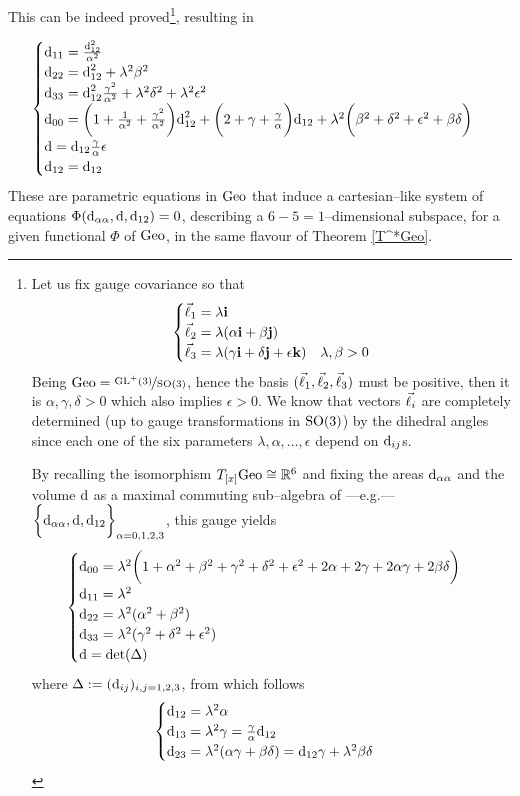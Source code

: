 This can be indeed proved\footnote{Let us fix gauge covariance so that
$$\begin{cases}
    \vec{\ell}_1=\lambda\mathbf{i}\\
    \vec{\ell}_2=\lambda(\alpha\mathbf{i}+\beta\mathbf{j})\\
    \vec{\ell}_3=\lambda(\gamma\mathbf{i}+\delta\mathbf{j}+\epsilon\mathbf{k})&\lambda,\beta>0
\end{cases}$$
Being $\text{\normalfont Geo}=\nicefrac{\text{\normalfont GL}^+(3)}{\text{\normalfont SO}(3)}$, hence the basis $(\vec{\ell}_1,\vec{\ell}_2,\vec{\ell}_3)$ must be positive, then it is $\alpha,\gamma,\delta>0$ which also implies $\epsilon>0$. We know that vectors $\vec{\ell}_i$ are completely determined (up to gauge transformations in $\text{\normalfont SO}(3)$) by the dihedral angles since each one of the six parameters $\lambda,\alpha,\hdots,\epsilon$ depend on $\text{\normalfont d}_{ij}$s.

By recalling the isomorphism $T_{[x]}\text{\normalfont Geo}\cong\mathbb{R}^6$ and fixing the areas $\text{\normalfont d}_{\alpha\alpha}$ and the volume $\text{\normalfont d}$ as a maximal commuting sub--algebra of ---e.g.---$\bigg\{\text{\normalfont d}_{\alpha\alpha},\text{\normalfont d},\text{\normalfont d}_{12}\bigg\}_{\alpha=0,1,2,3}$, this gauge yields
$$\begin{cases}
    \text{\normalfont d}_{00}=\lambda^2\bigg(1+\alpha^2+\beta^2+\gamma^2+\delta^2+\epsilon^2+2\alpha+2\gamma+2\alpha\gamma+2\beta\delta\bigg)\\
    \text{\normalfont d}_{11}=\lambda^2\\
    \text{\normalfont d}_{22}=\lambda^2(\alpha^2+\beta^2)\\
    \text{\normalfont d}_{33}=\lambda^2(\gamma^2+\delta^2+\epsilon^2)\\
    \text{\normalfont d}=\det(\Delta) \\
\end{cases}$$
where $\Delta:=(\text{\normalfont d}_{ij})_{i,j=1,2,3}$, from which follows
$$\begin{cases}
    \text{\normalfont d}_{12}=\lambda^2\alpha\\
    \text{\normalfont d}_{13}=\lambda^2\gamma=\frac{\gamma}{\alpha}\text{\normalfont d}_{12}\\
    \text{\normalfont d}_{23}=\lambda^2(\alpha\gamma+\beta\delta)=\text{\normalfont d}_{12}\gamma+\lambda^2\beta\delta
\end{cases}$$
}, resulting in

\begin{equation}
    \begin{cases}
    \text{\normalfont d}_{11}=\frac{\text{\normalfont d}_{12}^2}{\alpha^2}\\
    \text{\normalfont d}_{22}=\text{\normalfont d}_{12}^2+\lambda^2\beta^2\\
    \text{\normalfont d}_{33}=\text{\normalfont d}_{12}^2\frac{\gamma^2}{\alpha^2}+\lambda^2\delta^2+\lambda^2\epsilon^2\\
    \text{\normalfont d}_{00}=\bigg(1+\frac{1}{\alpha^2}+\frac{\gamma^2}{\alpha^2}\bigg)\text{\normalfont d}_{12}^2+\bigg(2+\gamma+\frac{\gamma}{\alpha}\bigg)\text{\normalfont d}_{12}+\lambda^2\bigg(\beta^2+\delta^2+\epsilon^2+\beta\delta\bigg)\\
    \text{\normalfont d}=\text{\normalfont d}_{12}\frac{\gamma}{\alpha}\epsilon\\
    \text{\normalfont d}_{12}=\text{\normalfont d}_{12}
\end{cases}
\end{equation}
These are parametric equations in $\text{\normalfont Geo}$ that induce a cartesian--like system of equations $\Phi(\text{\normalfont d}_{\alpha\alpha},\text{\normalfont d},\text{\normalfont d}_{12})=0$, describing a $6-5=1$--dimensional subspace, for a given functional $\Phi$ of $\text{\normalfont Geo}$, in the same flavour of Theorem \ref{T^*Geo}. 

